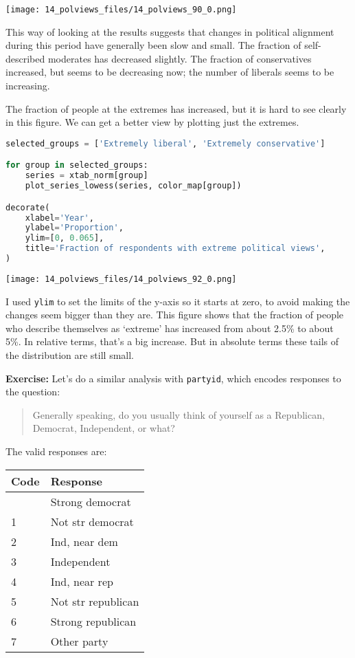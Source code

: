 \begin{center}
\texttt{[image: 14\_polviews\_files/14\_polviews\_90\_0.png]}
\end{center}

This way of looking at the results suggests that changes in political
alignment during this period have generally been slow and small. The
fraction of self-described moderates has decreased slightly. The
fraction of conservatives increased, but seems to be decreasing now; the
number of liberals seems to be increasing.

The fraction of people at the extremes has increased, but it is hard to
see clearly in this figure. We can get a better view by plotting just
the extremes.

\begin{lstlisting}[language=Python,style=source]
selected_groups = ['Extremely liberal', 'Extremely conservative']

for group in selected_groups:
    series = xtab_norm[group]
    plot_series_lowess(series, color_map[group])

decorate(
    xlabel='Year',
    ylabel='Proportion',
    ylim=[0, 0.065],
    title='Fraction of respondents with extreme political views',
)
\end{lstlisting}

\begin{center}
\texttt{[image: 14\_polviews\_files/14\_polviews\_92\_0.png]}
\end{center}

I used \passthrough{\lstinline!ylim!} to set the limits of the y-axis so
it starts at zero, to avoid making the changes seem bigger than they
are. This figure shows that the fraction of people who describe
themselves as `extreme' has increased from about 2.5\% to about 5\%. In
relative terms, that's a big increase. But in absolute terms these tails
of the distribution are still small.

\textbf{Exercise:} Let's do a similar analysis with
\passthrough{\lstinline!partyid!}, which encodes responses to the
question:

\begin{quote}
Generally speaking, do you usually think of yourself as a Republican,
Democrat, Independent, or what?
\end{quote}

The valid responses are:

\begin{longtable}[]{ll}
\midrule
Code & Response \\
\midrule
\endhead
\midrule
\endlastfoot
0 & Strong democrat \\
1 & Not str democrat \\
2 & Ind, near dem \\
3 & Independent \\
4 & Ind, near rep \\
5 & Not str republican \\
6 & Strong republican \\
7 & Other party \\
\end{longtable}

